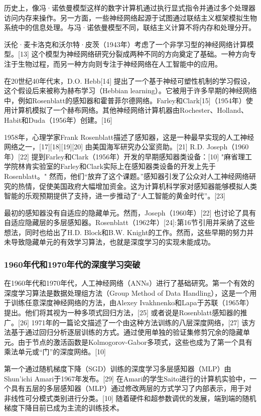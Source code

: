 历史上，像冯·诺依曼模型这样的数字计算机通过执行显式指令并通过多个处理器访问内存来操作。另一方面，一些神经网络起源于试图通过联结主义框架模拟生物系统中的信息处理。与冯·诺依曼模型不同，联结主义计算不将内存和处理分开。  

沃伦·麦卡洛克和沃尔特·皮茨（1943年）考虑了一个非学习型的神经网络计算模型。[13] 这个模型为神经网络研究分裂成两种不同的方向奠定了基础。一种方向专注于生物过程，而另一种方向则专注于神经网络在人工智能中的应用。

在20世纪40年代末，D.O. Hebb[14] 提出了一个基于神经可塑性机制的学习假设，这个假设后来被称为赫布学习（Hebbian learning）。它被用于许多早期的神经网络中，例如Rosenblatt的感知器和霍普菲尔德网络。Farley和Clark[15]（1954年）使用计算机模拟了一个赫布网络。其他神经网络计算机器由Rochester、Holland、Habit和Duda（1956年）创建。[16]  

1958年，心理学家Frank Rosenblatt描述了感知器，这是一种最早实现的人工神经网络之一，[17][18][19][20] 由美国海军研究办公室资助。[21] R.D. Joseph（1960年）[22] 提到Farley和Clark（1956年）开发的早期感知器类设备：[10] "麻省理工学院林肯实验室的Farley和Clark实际上在感知器类设备的开发上先于Rosenblatt。" 然而，他们“放弃了这个课题。”感知器引发了公众对人工神经网络研究的热情，促使美国政府大幅增加资金。这为计算机科学家对感知器能够模拟人类智能的乐观预期提供了支持，进一步推动了“人工智能的黄金时代”。[23]  

最初的感知器没有自适应的隐藏单元。然而，Joseph（1960年）[22] 也讨论了具有自适应隐藏层的多层感知器。Rosenblatt（1962年）[24]: 第16节 引用并采纳了这些想法，同时也给出了H.D. Block和B.W. Knight的工作。然而，这些早期的努力并未导致隐藏单元的有效学习算法，也就是深度学习的实现未能成功。
\subsubsection{1960年代和1970年代的深度学习突破}
在1960年代和1970年代，人工神经网络（ANNs）进行了基础研究。第一个有效的深度学习算法是数据处理组方法（Group Method of Data Handling），这是一个用于训练任意深度神经网络的方法，由Alexey Ivakhnenko和Lapa于苏联（1965年）提出。他们将其视为一种多项式回归方法，[25] 或者说是Rosenblatt感知器的推广。[26] 1971年的一篇论文描述了一个由这种方法训练的八层深度网络，[27] 该方法基于通过回归分析逐层训练的方式。通过使用单独的验证集修剪冗余的隐藏单元。由于节点的激活函数是Kolmogorov-Gabor多项式，这些也成为了第一个具有乘法单元或“门”的深度网络。[10]

第一个通过随机梯度下降（SGD）训练的深度学习多层感知器（MLP）由Shun'ichi Amari于1967年发布。[29] 在Amari的学生Saito进行的计算机实验中，一个具有五层的多层感知器（MLP）通过修改两层的方式学习了内部表示，用于对非线性可分模式类别进行分类。[10] 随着硬件和超参数调优的发展，端到端的随机梯度下降目前已成为主流的训练技术。

